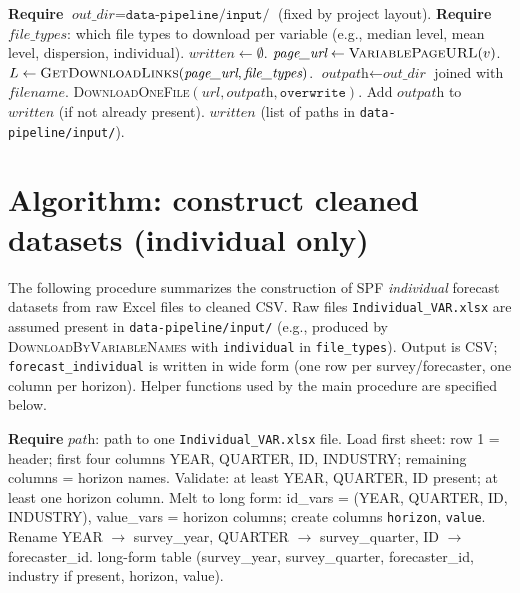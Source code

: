 \documentclass[11pt]{article}
\begin{document}
\begin{algorithm}[H]
\caption{\textsc{DownloadByVariableNames}$(\textit{variable\_names}, \textit{file\_types}, \textit{out\_dir}, \texttt{overwrite})$}
\begin{algorithmic}[1]
\State \textbf{Require} $\textit{out\_dir} = \texttt{data-pipeline/input/}$ (fixed by project layout).
\State \textbf{Require} $\textit{file\_types}$: which file types to download per variable (e.g., median level, mean level, dispersion, individual).
\State $\textit{written} \gets \emptyset$. 
    \State $\textit{page\_url} \gets \textsc{VariablePageURL}(v)$.
    \State $L \gets \textsc{GetDownloadLinks}(\textit{page\_url}, \textit{file\_types})$.
        \State $\textit{outpath} \gets \textit{out\_dir}$ joined with $\textit{filename}$.
        \State \textsc{DownloadOneFile}$(\textit{url}, \textit{outpath}, \texttt{overwrite})$.
        \State Add $\textit{outpath}$ to $\textit{written}$ (if not already present).
    \EndFor
\EndFor
\State \Return $\textit{written}$ (list of paths in \texttt{data-pipeline/input/}).
\end{algorithmic}
\end{algorithm}

\section{Algorithm: construct cleaned datasets (individual only)}

The following procedure summarizes the construction of SPF \emph{individual}
forecast datasets from raw Excel files to cleaned CSV. Raw files
\texttt{Individual\_VAR.xlsx} are assumed present in \texttt{data-pipeline/input/}
(e.g., produced by \textsc{DownloadByVariableNames} with \texttt{individual} in
\texttt{file\_types}). Output is CSV; \texttt{forecast\_individual} is written in
wide form (one row per survey/forecaster, one column per horizon).
Helper functions used by the main procedure are specified below.

\begin{algorithm}[H]
\caption{\textsc{LoadIndividualSheet}$(\textit{path})$}
\begin{algorithmic}[1]
\State \textbf{Require} $\textit{path}$: path to one \texttt{Individual\_VAR.xlsx} file.
\State Load first sheet: row 1 = header; first four columns YEAR, QUARTER, ID, INDUSTRY; remaining columns = horizon names.
\State Validate: at least YEAR, QUARTER, ID present; at least one horizon column.
\State Melt to long form: id\_vars = (YEAR, QUARTER, ID, INDUSTRY), value\_vars = horizon columns; create columns \texttt{horizon}, \texttt{value}.
\State Rename YEAR $\to$ survey\_year, QUARTER $\to$ survey\_quarter, ID $\to$ forecaster\_id.
\State \Return long-form table (survey\_year, survey\_quarter, forecaster\_id, industry if present, horizon, value).
\end{algorithmic}
\end{algorithm}
\end{document}
